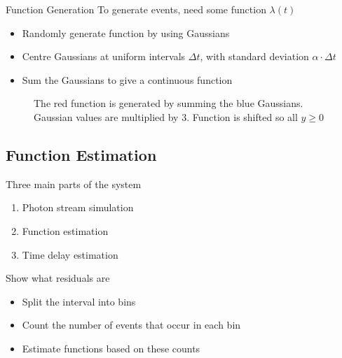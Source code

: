 \documentclass{beamer}
\begin{document}
\begin{frame}{Function Generation}
  To generate events, need some function $\lambda(t)$
  \begin{itemize}
  \item Randomly generate function by using Gaussians
  \item Centre Gaussians at uniform intervals $\Delta t$, with standard
    deviation $\alpha \cdot \Delta t$
  \item Sum the Gaussians to give a continuous function
  \end{itemize}
\end{frame}

\begin{frame}
  \begin{figure}
    \centering
    \caption{The red function is generated by summing the blue Gaussians. Gaussian values are multiplied by 3. Function is shifted so
      all $y\geq 0$}
  \end{figure}
\end{frame}

\subsection{Function Estimation}

\begin{frame}
  Three main parts of the system
  \begin{enumerate}
  \item Photon stream simulation
  \item \alert{Function estimation}
  \item Time delay estimation
  \end{enumerate}
\end{frame}

\begin{frame}
  Show what residuals are
\end{frame}

\begin{frame}
  \begin{itemize}
  \item Split the interval into bins
  \item Count the number of events that occur in each bin
  \item Estimate functions based on these counts
  \end{itemize}
\end{frame}
\end{document}
